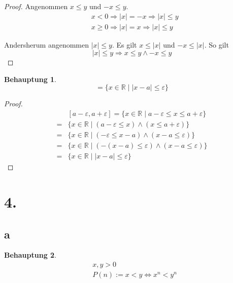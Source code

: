 \documentclass[a4paper,10pt]{article}
\newtheorem*{claim}{Behauptung}
\begin{document}
\begin{proof}
 Angenommen $x \le y$ und $-x \le y$.
 \begin{align*}
  & x < 0 \Rightarrow |x| = -x \Rightarrow |x| \le y\\
  & x \ge 0 \Rightarrow |x| = x \Rightarrow |x| \le y
 \end{align*}

 Andersherum angenommen $|x| \le y$. Es gilt $x \le |x|$ und $-x \le |x|$. So gilt
 \begin{equation*}
  |x| \le y \Rightarrow x \le y \land -x \le y
 \end{equation*}
\end{proof}

\begin{claim}
 \begin{equation*}
  [a - \varepsilon, a + \varepsilon] = \{x \in \mathbb{R} \mid |x - a| \le \varepsilon\}
 \end{equation*}
\end{claim}

\begin{proof}
 \begin{align*}
  & [a - \varepsilon, a + \varepsilon] = \{x \in \mathbb{R} \mid a - \varepsilon \le x \le a + \varepsilon\}\\
  = & \{x \in \mathbb{R} \mid (a - \varepsilon \le x) \land (x \le a + \varepsilon)\}\\
  = & \{x \in \mathbb{R} \mid (-\varepsilon \le x - a) \land (x - a \le \varepsilon)\}\\
  = & \{x \in \mathbb{R} \mid (-(x - a) \le \varepsilon) \land (x - a \le \varepsilon)\}\\
  = & \{x \in \mathbb{R} \mid |x - a| \le \varepsilon\}
 \end{align*}
\end{proof}

\section*{4.}

\subsection*{a}

\begin{claim}
 \begin{align*}
  & x, y > 0\\
  & P(n) := x < y \Leftrightarrow x^n < y^n
 \end{align*}
\end{claim}
\end{document}
